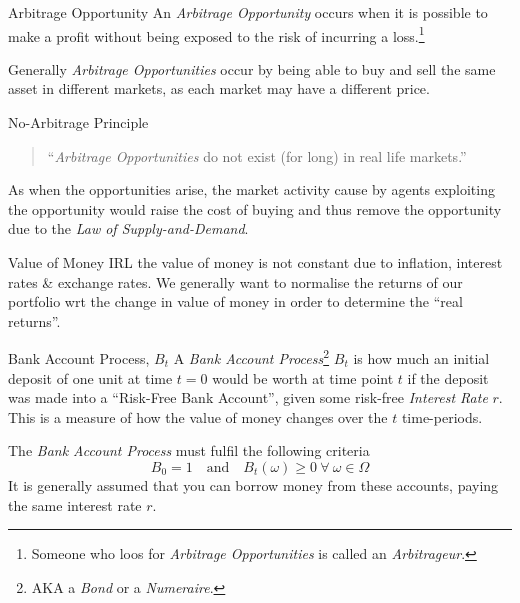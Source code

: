 \documentclass[11pt,a4paper]{article}
\begin{document}
  \begin{definition}{Arbitrage Opportunity}
    An \textit{Arbitrage Opportunity} occurs when it is possible to make a profit without being exposed to the risk of incurring a loss.\footnote{Someone who loos for \textit{Arbitrage Opportunities} is called an \textit{Arbitrageur}.}
    \par Generally \textit{Arbitrage Opportunities} occur by being able to buy and sell the same asset in different markets, as each market may have a different price.
  \end{definition}

  \begin{theorem}{No-Arbitrage Principle}
    \begin{quote}
      ``\textit{Arbitrage Opportunities} do not exist (for long) in real life markets.''
    \end{quote}
    As when the opportunities arise, the market activity cause by agents exploiting the opportunity would raise the cost of buying and thus remove the opportunity due to the \textit{Law of Supply-and-Demand}.
  \end{theorem}

  \begin{remark}{Value of Money}
    IRL the value of money is not constant due to inflation, interest rates \& exchange rates. We generally want to normalise the returns of our portfolio wrt the change in value of money in order to determine the ``real returns''.
  \end{remark}

  \begin{definition}{Bank Account Process, $B_t$}\label{def_bank_account_process}
    A \textit{Bank Account Process}\footnote{AKA a \textit{Bond} or a \textit{Numeraire}.} $B_t$ is how much an initial deposit of one unit at time $t=0$ would be worth at time point $t$ if the deposit was made into a ``Risk-Free Bank Account'', given some risk-free \textit{Interest Rate} $r$. This is a measure of how the value of money changes over the $t$ time-periods.
    \par The \textit{Bank Account Process} must fulfil the following criteria
    \[ B_0=1\quad\text{and}\quad B_t(\omega)\geq0\ \forall\ \omega\in\Omega \]
    It is generally assumed that you can borrow money from these accounts, paying the same interest rate $r$.
  \end{definition}
\end{document}

